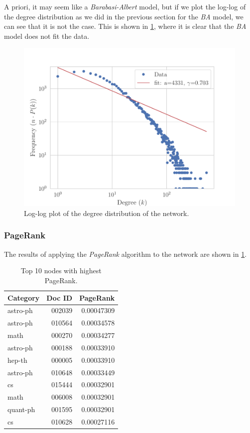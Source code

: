 A priori, it may seem like a \emph{Barabasi-Albert} model, but if we plot the log-log of the
degree distribution as we did in the previous section for the \emph{BA} model, we can
see that it is not the case. This is shown in \cref{fig:degree_dist_fit}, where it is clear
that the \emph{BA} model does not fit the data.

\begin{figure}[H]
    \includegraphics{figures/ba_fit_2nd}
    \caption{Log-log plot of the degree distribution of the network.}%
    \label{fig:degree_dist_fit}
\end{figure}

\pagebreak
\subsubsection{PageRank}

The results of applying the \emph{PageRank} algorithm to the network are shown in
\cref{tab:pagerank}.

\begin{table}[H]
	\caption{Top 10 nodes with highest PageRank.}%
    \label{tab:pagerank}
	\begin{tabular}{lrr}
		\toprule
		Category & Doc ID & PageRank   \\
		\midrule
		astro-ph & 002039 & 0.00047309 \\
		astro-ph & 010564 & 0.00034578 \\
		math     & 000270 & 0.00034277 \\
		astro-ph & 000188 & 0.00033910 \\
		hep-th   & 000005 & 0.00033910 \\
		astro-ph & 010648 & 0.00033449 \\
		cs       & 015444 & 0.00032901 \\
		math     & 006008 & 0.00032901 \\
		quant-ph & 001595 & 0.00032901 \\
		cs       & 010628 & 0.00027116 \\
		\bottomrule
	\end{tabular}
\end{table}

